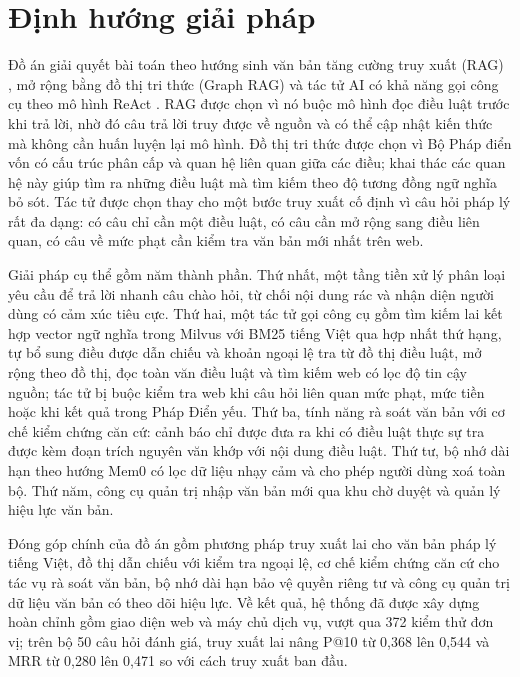 \documentclass[../DoAn.tex]{subfiles}
\begin{document}
\section{Định hướng giải pháp}
\label{section:1.3}
Đồ án giải quyết bài toán theo hướng sinh văn bản tăng cường truy xuất (RAG) \cite{lewis2020rag}, mở rộng bằng đồ thị tri thức (Graph RAG) \cite{edge2024graphrag} và tác tử AI có khả năng gọi công cụ theo mô hình ReAct \cite{yao2023react}. RAG được chọn vì nó buộc mô hình đọc điều luật trước khi trả lời, nhờ đó câu trả lời truy được về nguồn và có thể cập nhật kiến thức mà không cần huấn luyện lại mô hình. Đồ thị tri thức được chọn vì Bộ Pháp điển vốn có cấu trúc phân cấp và quan hệ liên quan giữa các điều; khai thác các quan hệ này giúp tìm ra những điều luật mà tìm kiếm theo độ tương đồng ngữ nghĩa bỏ sót. Tác tử được chọn thay cho một bước truy xuất cố định vì câu hỏi pháp lý rất đa dạng: có câu chỉ cần một điều luật, có câu cần mở rộng sang điều liên quan, có câu về mức phạt cần kiểm tra văn bản mới nhất trên web.

Giải pháp cụ thể gồm năm thành phần. Thứ nhất, một tầng tiền xử lý phân loại yêu cầu để trả lời nhanh câu chào hỏi, từ chối nội dung rác và nhận diện người dùng có cảm xúc tiêu cực. Thứ hai, một tác tử gọi công cụ gồm tìm kiếm lai kết hợp vector ngữ nghĩa trong Milvus với BM25 tiếng Việt qua hợp nhất thứ hạng, tự bổ sung điều được dẫn chiếu và khoản ngoại lệ tra từ đồ thị điều luật, mở rộng theo đồ thị, đọc toàn văn điều luật và tìm kiếm web có lọc độ tin cậy nguồn; tác tử bị buộc kiểm tra web khi câu hỏi liên quan mức phạt, mức tiền hoặc khi kết quả trong Pháp Điển yếu. Thứ ba, tính năng rà soát văn bản với cơ chế kiểm chứng căn cứ: cảnh báo chỉ được đưa ra khi có điều luật thực sự tra được kèm đoạn trích nguyên văn khớp với nội dung điều luật. Thứ tư, bộ nhớ dài hạn theo hướng Mem0 \cite{chhikara2025mem0} có lọc dữ liệu nhạy cảm và cho phép người dùng xoá toàn bộ. Thứ năm, công cụ quản trị nhập văn bản mới qua khu chờ duyệt và quản lý hiệu lực văn bản.

Đóng góp chính của đồ án gồm phương pháp truy xuất lai cho văn bản pháp lý tiếng Việt, đồ thị dẫn chiếu với kiểm tra ngoại lệ, cơ chế kiểm chứng căn cứ cho tác vụ rà soát văn bản, bộ nhớ dài hạn bảo vệ quyền riêng tư và công cụ quản trị dữ liệu văn bản có theo dõi hiệu lực. Về kết quả, hệ thống đã được xây dựng hoàn chỉnh gồm giao diện web và máy chủ dịch vụ, vượt qua 372 kiểm thử đơn vị; trên bộ 50 câu hỏi đánh giá, truy xuất lai nâng P@10 từ 0,368 lên 0,544 và MRR từ 0,280 lên 0,471 so với cách truy xuất ban đầu.
\end{document}
